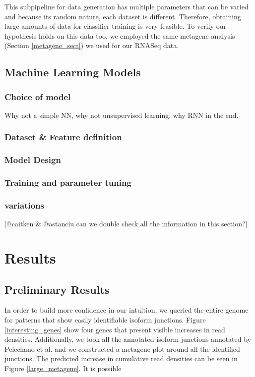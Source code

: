 \documentclass[12pt]{article}
\begin{document}
This subpipeline for data generation has multiple parameters that can be varied and because its random nature, each dataset is different. Therefore, obtaining large amounts of data for classifier training is very feasible. To verify our hypothesis holds on this data too, we employed the same metagene analysis (Section \ref{metagene_sect}) we used for our RNASeq data.  

\subsection{Machine Learning Models}
\subsubsection{Choice of model}
Why not a simple NN, why not unsupervised learning, why RNN in the end. 
\subsubsection{Dataset \& Feature definition}
\subsubsection{Model Design}
\subsubsection{Training and parameter tuning}
\subsubsection{variations}

[@caitken \& @astanciu can we double check all the information in this section?]


\section{Results}\label{res}
\subsection{Preliminary Results}
In order to build more confidence in our intuition, we queried the entire genome for patterns that show easily identifiable isoform junctions. Figure \ref{interesting_genes} show four genes that present visible increases in read densities. 
Additionally, we took all the annotated isoform junctions annotated by Pelechano et al. \cite{Pelechano2013} and we constructed a metagene plot around all the identified junctions. The predicted increase in cumulative read densities can be seen in Figure \ref{large_metagene}. It is possible 
\end{document}
